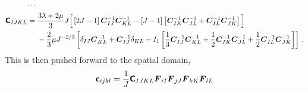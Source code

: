 \documentclass[10pt,letterpaper,oneside]{report}
\newcommand{\ten}[1]{\mbox{\boldmath $#1$}{}}
\newcommand{\tenf}[1]{\mbox{{\sffamily{\bfseries {#1}}}}}
\begin{document}
\begin{itemize}
\begin{align}
\cdots{}& \notag \\
\tenf{C}_{IJKL} ={}& \frac{3 \lambda + 2 \mu}{3} J \Big[ \left[ 2J - 1 \right] \ten{C}^{-1}_{IJ} \ten{C}^{-1}_{KL} - \left[ J - 1 \right] \left[ \ten{C}^{-1}_{IK} \ten{C}^{-1}_{JL} + \ten{C}^{-1}_{IL} \ten{C}^{-1}_{JK} \right] \Big] \notag \\ & - \frac{2}{3} \mu  J^{-2/3} \left[ \delta_{IJ} \ten{C}^{-1}_{KL} + \ten{C}^{-1}_{IJ} \delta_{KL} - I_1 \left[ \frac{1}{3} \ten{C}^{-1}_{IJ} \ten{C}^{-1}_{KL} + \frac{1}{2} \ten{C}^{-1}_{IK} \ten{C}^{-1}_{JL} + \frac{1}{2} \ten{C}^{-1}_{IL} \ten{C}^{-1}_{JK} \right] \right] \, . 
\end{align}
This is then pushed forward to the spatial domain, 
\begin{align}
\tenf{c}_{ijkl} ={}& \frac{1}{J} \tenf{C}_{IJKL} \ten{F}_{iI} \ten{F}_{jJ} \ten{F}_{kK} \ten{F}_{lL}  
\\

\end{align}
\end{itemize}
\end{document}
